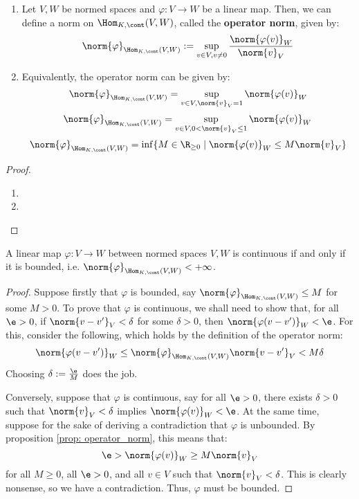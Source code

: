         \begin{proposition} \label{prop: operator_norm}
            \begin{enumerate}
                \item Let $V, W$ be normed spaces and $\varphi: V \to W$ be a linear map. Then, we can define a norm on $\Hom_{K, \cont}(V, W)$, called the \textbf{operator norm}, given by:
                    $$\norm{\varphi}_{\Hom_{K, \cont}(V, W)} := \sup_{v \in V, v \not = 0} \frac{ \norm{\varphi(v)}_W }{ \norm{v}_V }$$
                \item Equivalently, the operator norm can be given by:
                    $$\norm{\varphi}_{\Hom_{K, \cont}(V, W)} = \sup_{v \in V, \norm{v}_V = 1} \norm{\varphi(v)}_W$$
                    $$\norm{\varphi}_{\Hom_{K, \cont}(V, W)} = \sup_{v \in V, 0 < \norm{v}_V \leq 1} \norm{\varphi(v)}_W$$
                    $$\norm{\varphi}_{\Hom_{K, \cont}(V, W)} = \inf\{ M \in \R_{\geq 0} \mid \norm{\varphi(v)}_W \leq M \norm{v}_V \}$$
            \end{enumerate}
        \end{proposition}
            \begin{proof}
                \begin{enumerate}
                    \item 
                    \item 
                \end{enumerate}
            \end{proof}
        \begin{lemma} \label{lemma: bounded_linear_maps}
            A linear map $\varphi: V \to W$ between normed spaces $V, W$ is continuous if and only if it is bounded, i.e. $\norm{\varphi}_{\Hom_{K, \cont}(V, W)} < +\infty$.
        \end{lemma}
            \begin{proof}
                Suppose firstly that $\varphi$ is bounded, say $\norm{\varphi}_{\Hom_{K, \cont}(V, W)} \leq M$ for some $M > 0$. To prove that $\varphi$ is continuous, we shall need to show that, for all $\e > 0$, if $\norm{v - v'}_V < \delta$ for some $\delta > 0$, then $\norm{\varphi(v - v')}_W < \e$. For this, consider the following, which holds by the definition of the operator norm:
                    $$\norm{\varphi(v - v')}_W \leq \norm{\varphi}_{\Hom_{K, \cont}(V, W)} \norm{v - v'}_V < M \delta$$
                Choosing $\delta := \frac{\e}{M}$ does the job.

                Conversely, suppose that $\varphi$ is continuous, say for all $\e > 0$, there exists $\delta > 0$ such that $\norm{v}_V < \delta$ implies $\norm{\varphi(v)}_W < \e$. At the same time, suppose for the sake of deriving a contradiction that $\varphi$ is unbounded. By proposition \ref{prop: operator_norm}, this means that:
                    $$\e > \norm{\varphi(v)}_W \geq M \norm{v}_V$$
                for all $M \geq 0$, all $\e > 0$, and all $v \in V$ such that $\norm{v}_V < \delta$. This is clearly nonsense, so we have a contradiction. Thus, $\varphi$ must be bounded.
            \end{proof}

